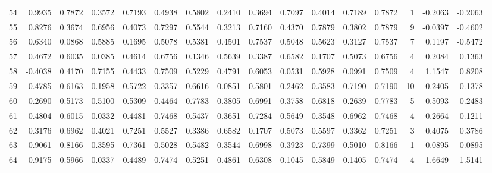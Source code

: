 \begin{tabular}{lrrrrrrrrrrrrrrr}
54  &      0.9935 &  0.7872 &  0.3572 &  0.7193 &  0.4938 &  0.5802 &  0.2410 &  0.3694 &  0.7097 &  0.4014 &   0.7189 &     0.7872 &      1 &                   -0.2063 &                    -0.2063 \\
55  &      0.8276 &  0.3674 &  0.6956 &  0.4073 &  0.7297 &  0.5544 &  0.3213 &  0.7160 &  0.4370 &  0.7879 &   0.3802 &     0.7879 &      9 &                   -0.0397 &                    -0.4602 \\
56  &      0.6340 &  0.0868 &  0.5885 &  0.1695 &  0.5078 &  0.5381 &  0.4501 &  0.7537 &  0.5048 &  0.5623 &   0.3127 &     0.7537 &      7 &                    0.1197 &                    -0.5472 \\
57  &      0.4672 &  0.6035 &  0.0385 &  0.4614 &  0.6756 &  0.1346 &  0.5639 &  0.3387 &  0.6582 &  0.1707 &   0.5073 &     0.6756 &      4 &                    0.2084 &                     0.1363 \\
58  &     -0.4038 &  0.4170 &  0.7155 &  0.4433 &  0.7509 &  0.5229 &  0.4791 &  0.6053 &  0.0531 &  0.5928 &   0.0991 &     0.7509 &      4 &                    1.1547 &                     0.8208 \\
59  &      0.4785 &  0.6163 &  0.1958 &  0.5722 &  0.3357 &  0.6616 &  0.0851 &  0.5801 &  0.2462 &  0.3583 &   0.7190 &     0.7190 &     10 &                    0.2405 &                     0.1378 \\
60  &      0.2690 &  0.5173 &  0.5100 &  0.5309 &  0.4464 &  0.7783 &  0.3805 &  0.6991 &  0.3758 &  0.6818 &   0.2639 &     0.7783 &      5 &                    0.5093 &                     0.2483 \\
61  &      0.4804 &  0.6015 &  0.0332 &  0.4481 &  0.7468 &  0.5437 &  0.3651 &  0.7284 &  0.5649 &  0.3548 &   0.6962 &     0.7468 &      4 &                    0.2664 &                     0.1211 \\
62  &      0.3176 &  0.6962 &  0.4021 &  0.7251 &  0.5527 &  0.3386 &  0.6582 &  0.1707 &  0.5073 &  0.5597 &   0.3362 &     0.7251 &      3 &                    0.4075 &                     0.3786 \\
63  &      0.9061 &  0.8166 &  0.3595 &  0.7361 &  0.5028 &  0.5482 &  0.3544 &  0.6998 &  0.3923 &  0.7399 &   0.5010 &     0.8166 &      1 &                   -0.0895 &                    -0.0895 \\
64  &     -0.9175 &  0.5966 &  0.0337 &  0.4489 &  0.7474 &  0.5251 &  0.4861 &  0.6308 &  0.1045 &  0.5849 &   0.1405 &     0.7474 &      4 &                    1.6649 &                     1.5141 \\

\end{tabular}
